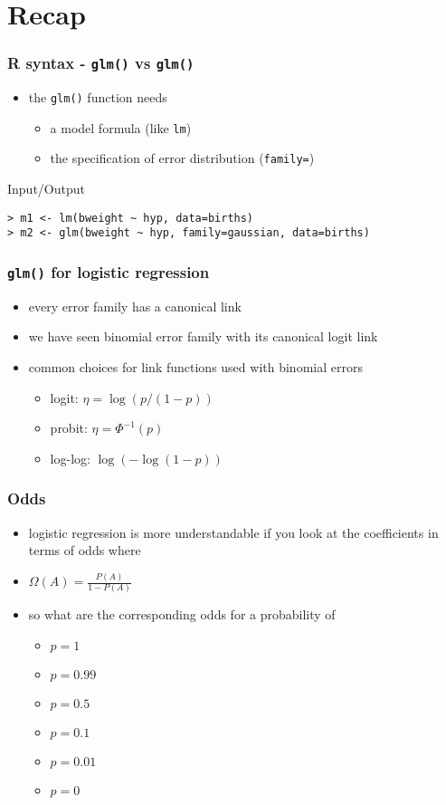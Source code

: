 \section{Recap}

\begin{frame}[fragile]\frametitle{R syntax - \texttt{glm()} vs \texttt{glm()}}
  \begin{itemize}
  \item the \texttt{glm()} function needs
    \begin{itemize}
    \item a model formula (like \texttt{lm})
    \item the specification of error distribution (\texttt{family=})
    \end{itemize}
  \end{itemize}
\begin{exampleblock}{Input/Output}\small
\begin{verbatim}
> m1 <- lm(bweight ~ hyp, data=births)
> m2 <- glm(bweight ~ hyp, family=gaussian, data=births)
\end{verbatim}
\end{exampleblock}
\end{frame}

\begin{frame}\frametitle{\texttt{glm()} for logistic regression}
  \begin{itemize}
    \item every error family has a canonical link
    \item we have seen binomial error family with its canonical logit link
    \item common choices for link functions used with binomial errors
      \begin{itemize}
      \item logit: $\eta = \log(p/(1-p))$
      \item probit: $\eta = \Phi^{-1}(p)$ 
      \item log-log: $\log(-\log(1-p))$
      \end{itemize}
  \end{itemize}
\end{frame}


\begin{frame}\frametitle{Odds}
  \begin{itemize}
    \item logistic regression is more understandable if you look at the coefficients in terms of odds where
    \item $\Omega(A) = \frac{P(A)}{1-P(A)}$
    \item so what are the corresponding odds for a probability of
      \begin{itemize}
      \item $p = 1$
      \item $p = 0.99$
      \item $p = 0.5$
      \item $p = 0.1$
      \item $p = 0.01$
      \item $p = 0$        
      \end{itemize}
  \end{itemize}
\end{frame}


